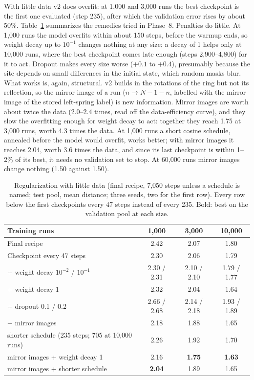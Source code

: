 \documentclass[11pt]{article}
\begin{document}
With little data v2 does overfit: at 1,000 and 3,000 runs the best checkpoint is the first one evaluated (step 235), after which the validation error rises by about 50\%. Table~\ref{tab:reg} summarizes the remedies tried in Phase~8. Penalties do little. At 1,000 runs the model overfits within about 150 steps, before the warmup ends, so weight decay up to $10^{-1}$ changes nothing at any size; a decay of 1 helps only at 10,000 runs, where the best checkpoint comes late enough (steps 2,900--4,800) for it to act. Dropout \cite{srivastava2014dropout} makes every size worse ($+0.1$ to $+0.4$), presumably because the site depends on small differences in the initial state, which random masks blur. What works is, again, structural. v2 builds in the rotations of the ring but not its reflection, so the mirror image of a run ($n\to N-1-n$, labelled with the mirror image of the stored left-spring label) is new information. Mirror images are worth about twice the data (2.0--2.4 times, read off the data-efficiency curve), and they slow the overfitting enough for weight decay to act: together they reach 1.75 at 3,000 runs, worth 4.3 times the data. At 1,000 runs a short cosine schedule, annealed before the model would overfit, works better; with mirror images it reaches 2.04, worth 3.6 times the data, and since its last checkpoint is within 1--2\% of its best, it needs no validation set to stop. At 60,000 runs mirror images change nothing (1.50 against 1.50).

\begin{table}[htbp]
  \centering
  \caption{Regularization with little data (final recipe, 7,050 steps unless a schedule is named; test pool, mean distance; three seeds, two for the first row). Every row below the first checkpoints every 47 steps instead of every 235. Bold: best on the validation pool at each size.}
  \label{tab:reg}
  \small
  \begin{tabular}{@{}lccc@{}}
    \toprule
    Training runs & 1,000 & 3,000 & 10,000 \\
    \midrule
    Final recipe & 2.42 & 2.07 & 1.80 \\
    Checkpoint every 47 steps & 2.30 & 2.06 & 1.79 \\
    \quad + weight decay $10^{-2}$ / $10^{-1}$ & 2.30 / 2.31 & 2.10 / 2.10 & 1.79 / 1.77 \\
    \quad + weight decay 1 & 2.32 & 2.04 & 1.64 \\
    \quad + dropout 0.1 / 0.2 & 2.66 / 2.68 & 2.14 / 2.18 & 1.93 / 1.89 \\
    \quad + mirror images & 2.18 & 1.88 & 1.65 \\
    \quad shorter schedule (235 steps; 705 at 10,000 runs) & 2.26 & 1.92 & 1.70 \\
    \quad mirror images + weight decay 1 & 2.16 & \textbf{1.75} & \textbf{1.63} \\
    \quad mirror images + shorter schedule & \textbf{2.04} & 1.89 & 1.65 \\
    \bottomrule
  \end{tabular}
\end{table}
\end{document}
